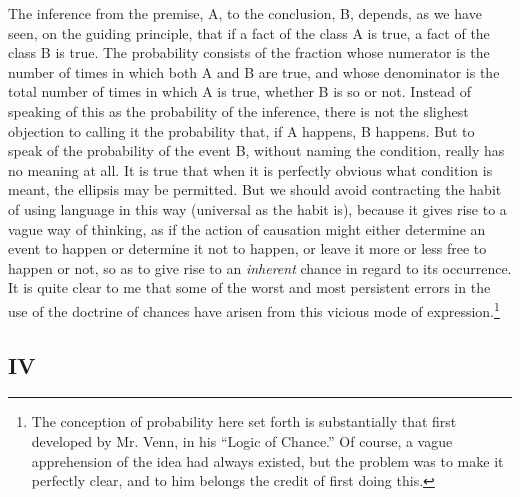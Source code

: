 The inference from the premise, A, to the conclusion, B, depends, as we have seen, on the guiding principle, that if a fact of the class A is true, a fact of the class B is true. The probability consists of the fraction whose numerator is the number of times in which both A and B are true, and whose denominator is the total number of times in which A is true, whether B is so or not. Instead of speaking of this as the probability of the inference, there is not the slighest objection to calling it the probability that, if A happens, B happens. But to speak of the probability of the event B, without naming the condition, really has no meaning at all. It is true that when it is perfectly obvious what condition is meant, the ellipsis may be permitted. But we should avoid contracting the habit of using language in this way (universal as the habit is), because it gives rise to a vague way of thinking, as if the action of causation might either determine an event to happen or determine it not to happen, or leave it more or less free to happen or not, so as to give rise to an \emph{inherent} chance in regard to its occurrence. It is quite clear to me that some of the worst and most persistent errors in the use of the doctrine of chances have arisen from this vicious mode of expression.\footnote{The conception of probability here set forth is substantially that first developed by Mr. Venn, in his ``Logic of Chance.'' Of course, a vague apprehension of the idea had always existed, but the problem was to make it perfectly clear, and to him belongs the credit of first doing this.}

\subsection*{IV}


